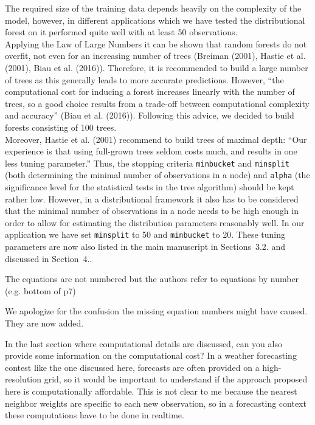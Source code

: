 \documentclass[american,foldmarks=false,noconfig]{uibklttr}
\newenvironment{review}{\fontshape{\itdefault}\fontseries{\bfdefault} \selectfont \smallskip}{\par}
\begin{document}
The required size of the training data depends heavily on the complexity 
of the model, however, in different applications which we have tested the 
distributional forest on it performed quite well with at least 50 observations. \\
Applying the Law of Large Numbers it can be shown that random forests do not overfit, 
not even for an increasing number of trees (Breiman (2001), Hastie et al. (2001), 
Biau et al. (2016)). Therefore, it is recommended to build a large number of trees
as this generally leads to more accurate predictions. However, ``the computational cost 
for inducing a forest increases linearly with the number of trees, so a good choice 
results from a trade-off between computational complexity and accuracy'' 
(Biau et al. (2016)). Following this advice, we decided to build forests consisting 
of 100 trees.\\
Moreover, Hastie et al. (2001) recommend to build trees of maximal depth:
``Our experience is that using full-grown trees seldom costs much, and 
results in one less tuning parameter.''
Thus, the stopping criteria \texttt{minbucket} and \texttt{minsplit} (both 
determining the minimal number of observations in a node) and \texttt{alpha} 
(the significance level for the statistical tests in the tree algorithm) should 
be kept rather low. However, in a distributional framework it also has to be 
considered that the minimal number of observations in a node needs to be high 
enough in order to allow for estimating the distribution parameters reasonably well.
In our application we have set \texttt{minsplit} to 50 and \texttt{minbucket} to 20.
These tuning parameters are now also listed in the main manuscript in Sections~3.2.
and discussed in Section~4..


\begin{review}
The equations are not numbered but the authors refer to equations 
by number (e.g. bottom of p7)
\end{review}

We apologize for the confusion the missing equation numbers 
might have caused. They are now added.

\begin{review}
In the last section where computational details are discussed, 
can you also provide some information on the computational cost? 
In a weather forecasting contest like the one discussed here, 
forecasts are often provided on a high-resolution grid, 
so it would be important to understand if the approach 
proposed here is computationally affordable. This is not clear 
to me because the nearest neighbor weights are specific 
to each new observation, so in a forecasting context these 
computations have to be done in realtime.
\end{review}
\end{document}
